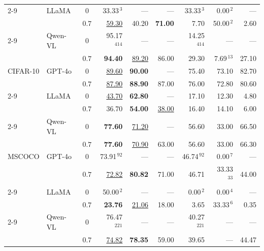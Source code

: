 \begin{table}[t]
\begin{tabular}{@{}ll c rrrrrr@{}}
\cmidrule(l){2-9}
          & LLaMA    & $0$ &    33.33$^{\,3}$ &              --- &              --- &    33.33$^{\,3}$ &     0.00$^{\,2}$ &              --- \\
          &          & $0.7$ & \underline{59.30} &            40.20 &   \textbf{71.00} &             7.70 &    50.00$^{\,2}$ &             2.60 \\
\cmidrule(l){2-9}
          & Qwen-VL  & $0$ &  95.17$^{\,414}$ &              --- &              --- &  14.25$^{\,414}$ &              --- &              --- \\
          &          & $0.7$ &   \textbf{94.40} & \underline{89.20} &            86.00 &            29.30 &    7.69$^{\,13}$ &            27.10 \\
\midrule
CIFAR-10  & GPT-4o   & $0$ & \underline{89.60} &   \textbf{90.00} &              --- &            75.40 &            73.10 &            82.70 \\
          &          & $0.7$ & \underline{87.90} &   \textbf{88.90} &            87.00 &            76.00 &            72.80 &            80.60 \\
\cmidrule(l){2-9}
          & LLaMA    & $0$ & \underline{43.70} &   \textbf{62.80} &              --- &            17.10 &            12.30 &             4.80 \\
          &          & $0.7$ &            36.70 &   \textbf{54.00} & \underline{38.00} &            16.40 &            14.10 &             6.00 \\
\cmidrule(l){2-9}
          & Qwen-VL  & $0$ &   \textbf{77.60} & \underline{71.20} &              --- &            56.60 &            33.00 &            66.50 \\
          &          & $0.7$ &   \textbf{77.60} & \underline{70.90} &            63.00 &            56.60 &            33.00 &            66.30 \\
\midrule
MSCOCO    & GPT-4o   & $0$ &   73.91$^{\,92}$ &              --- &              --- &   46.74$^{\,92}$ &     0.00$^{\,7}$ &              --- \\
          &          & $0.7$ & \underline{72.82} &   \textbf{80.82} &            71.00 &            46.71 &   33.33$^{\,33}$ &            44.00 \\
\cmidrule(l){2-9}
          & LLaMA    & $0$ &    50.00$^{\,2}$ &              --- &              --- &     0.00$^{\,2}$ &     0.00$^{\,4}$ &              --- \\
          &          & $0.7$ &   \textbf{23.76} & \underline{21.06} &            18.00 &             3.65 &    33.33$^{\,6}$ &             0.35 \\
\cmidrule(l){2-9}
          & Qwen-VL  & $0$ &  76.47$^{\,221}$ &              --- &              --- &  40.27$^{\,221}$ &              --- &              --- \\
          &          & $0.7$ & \underline{74.82} &   \textbf{78.35} &            59.00 &            39.65 &              --- &            44.47 \\
\bottomrule
\end{tabular}
\end{table}
